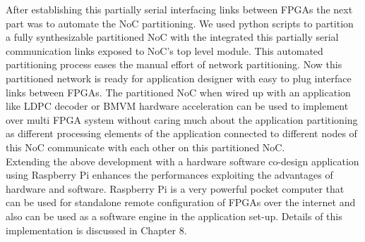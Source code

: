 After establishing this partially serial interfacing links between FPGAs the next part was to automate the NoC partitioning. We used python scripts to partition a fully synthesizable partitioned NoC with the integrated this partially serial communication links exposed to NoC's top level module. This automated partitioning process eases the manual effort of network partitioning. Now this partitioned network is ready for application designer with easy to plug interface links between FPGAs. The partitioned NoC when wired up with an application like LDPC decoder or BMVM hardware acceleration can be used to implement over multi FPGA system without caring much about the application partitioning as different processing elements of the application connected to different nodes of this NoC communicate with each other on this partitioned NoC.\\

Extending the above development with a hardware software co-design application using Raspberry Pi enhances the performances exploiting the advantages of hardware and software. Raspberry Pi is a very powerful pocket computer that can be used for standalone remote configuration of FPGAs over the internet and also can be used as a software engine in the application set-up. Details of this implementation is discussed in Chapter 8.
\newpage
